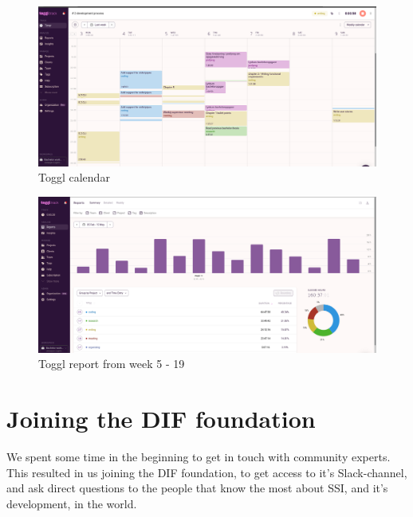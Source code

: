     \begin{figure}[htbp]
      \centering
      \includegraphics[width=1\textwidth]{figures/toggl-calendar.png}
      \caption[]{Toggl calendar}
    \end{figure}
    
    \begin{figure}[htbp]
      \centering
      \includegraphics[width=1\textwidth]{figures/toggl-report.png}
      \caption[]{Toggl report from week 5 - 19}
    \end{figure}



\section{Joining the DIF foundation}

We spent some time in the beginning to get in touch with community experts. This resulted in us joining the DIF foundation, to get access to it's Slack-channel, and ask direct questions to the people that know the most about SSI, and it's development, in the world.
